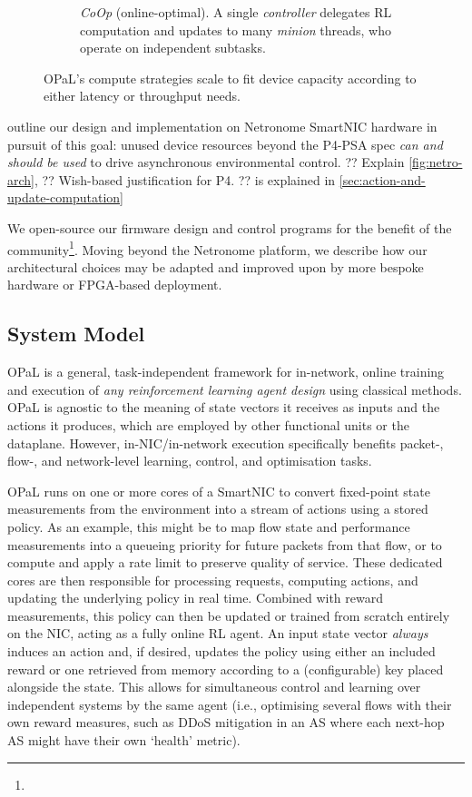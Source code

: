\documentclass[
sigconf,natbib=false
]{acmart}
\newcommand{\approachshort}{OPaL}
\newcommand{\Coopfw}{\emph{CoOp}}
\begin{document}
\begin{figure}
\begin{subfigure}{0.45\linewidth}
		\caption{\Coopfw{} (online-optimal). A single \emph{controller} delegates RL computation and updates to many \emph{minion} threads, who operate on independent subtasks.\label{fig:single-and-parallel:parallel}}
	\end{subfigure}
	\caption{\approachshort{}'s compute strategies scale to fit device capacity according to either latency or throughput needs.\label{fig:single-and-parallel}}
\end{figure}

 outline our design and implementation on Netronome SmartNIC hardware in pursuit of this goal: unused device resources beyond the P4-PSA spec \emph{can and should be used} to drive asynchronous environmental control.
?? Explain \cref{fig:netro-arch},
?? Wish-based justification for P4.
??  is explained in \cref{sec:action-and-update-computation}

We open-source our firmware design and control programs for the benefit of the community\footnote{}.
Moving beyond the Netronome platform, we describe how our architectural choices may be adapted and improved upon by more bespoke hardware or FPGA-based deployment.

\subsection{System Model}
\approachshort{} is a general, task-independent framework for in-network, online training and execution of \emph{any reinforcement learning agent design} using classical methods.
\approachshort{} is agnostic to the meaning of state vectors it receives as inputs and the actions it produces, which are employed by other functional units or the dataplane.
However, in-NIC/in-network execution specifically benefits packet-, flow-, and network-level learning, control, and optimisation tasks.

\approachshort{} runs on one or more cores of a SmartNIC to convert fixed-point state measurements from the environment into a stream of actions using a stored policy.
As an example, this might be to map flow state and performance measurements into a queueing priority for future packets from that flow, or to compute and apply a rate limit to preserve quality of service.
These dedicated cores are then responsible for processing requests, computing actions, and updating the underlying policy in real time.
Combined with reward measurements, this policy can then be updated or trained from scratch entirely on the NIC, acting as a fully online RL agent.
An input state vector \emph{always} induces an action and, if desired, updates the policy using either an included reward or one retrieved from memory according to a (configurable) key placed alongside the state.
This allows for simultaneous control and learning over independent systems by the same agent (i.e., optimising several flows with their own reward measures, such as DDoS mitigation in an AS where each next-hop AS might have their own `health' metric).
\end{document}
